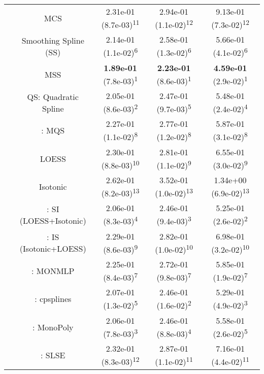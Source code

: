\begin{tabular}{ccccc}
&MCS& 2.31e-01 (8.7e-03)\textsuperscript{11}& 2.94e-01 (1.1e-02)\textsuperscript{12}& 9.13e-01 (7.3e-02)\textsuperscript{12}\tabularnewline
&Smoothing Spline (SS)& 2.14e-01 (1.1e-02)\textsuperscript{6}& 2.58e-01 (1.3e-02)\textsuperscript{6}& 5.66e-01 (4.1e-02)\textsuperscript{6}\tabularnewline
&MSS& \textbf{1.89e-01} (7.8e-03)\textsuperscript{1}& \textbf{2.23e-01} (8.6e-03)\textsuperscript{1}& \textbf{4.59e-01} (2.9e-02)\textsuperscript{1}\tabularnewline
&QS: Quadratic Spline& 2.05e-01 (8.6e-03)\textsuperscript{2}& 2.47e-01 (9.7e-03)\textsuperscript{5}& 5.48e-01 (2.4e-02)\textsuperscript{4}\tabularnewline
&\textcite{heMonotoneBsplineSmoothing1998}: MQS& 2.27e-01 (1.1e-02)\textsuperscript{8}& 2.77e-01 (1.2e-02)\textsuperscript{8}& 5.87e-01 (3.1e-02)\textsuperscript{8}\tabularnewline
&LOESS& 2.30e-01 (8.8e-03)\textsuperscript{10}& 2.81e-01 (1.1e-02)\textsuperscript{9}& 6.55e-01 (3.0e-02)\textsuperscript{9}\tabularnewline
&Isotonic& 2.62e-01 (8.2e-03)\textsuperscript{13}& 3.52e-01 (1.0e-02)\textsuperscript{13}& 1.34e+00 (6.9e-02)\textsuperscript{13}\tabularnewline
&\textcite{mammenEstimatingSmoothMonotone1991}: SI (LOESS+Isotonic)& 2.06e-01 (8.3e-03)\textsuperscript{4}& 2.46e-01 (9.4e-03)\textsuperscript{3}& 5.25e-01 (2.6e-02)\textsuperscript{2}\tabularnewline
&\textcite{mammenEstimatingSmoothMonotone1991}: IS (Isotonic+LOESS)& 2.29e-01 (8.6e-03)\textsuperscript{9}& 2.82e-01 (1.0e-02)\textsuperscript{10}& 6.98e-01 (3.2e-02)\textsuperscript{10}\tabularnewline
&\textcite{cannonMonmlpMultilayerPerceptron2017}: MONMLP& 2.25e-01 (8.4e-03)\textsuperscript{7}& 2.72e-01 (9.8e-03)\textsuperscript{7}& 5.85e-01 (1.9e-02)\textsuperscript{7}\tabularnewline
&\textcite{navarro-garciaConstrainedSmoothingOutofrange2023}: cpsplines& 2.07e-01 (1.3e-02)\textsuperscript{5}& 2.46e-01 (1.6e-02)\textsuperscript{2}& 5.29e-01 (4.9e-02)\textsuperscript{3}\tabularnewline
&\textcite{murrayFastFlexibleMethods2016a}: MonoPoly& 2.06e-01 (7.8e-03)\textsuperscript{3}& 2.46e-01 (8.8e-03)\textsuperscript{4}& 5.58e-01 (2.6e-02)\textsuperscript{5}\tabularnewline
&\textcite{groeneboomConfidenceIntervalsMonotone2023}: SLSE& 2.32e-01 (8.3e-03)\textsuperscript{12}& 2.87e-01 (1.1e-02)\textsuperscript{11}& 7.16e-01 (4.4e-02)\textsuperscript{11}\tabularnewline
\bottomrule
\end{tabular}
